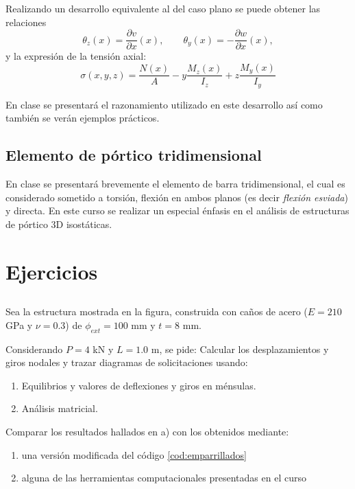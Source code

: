 Realizando un desarrollo equivalente al del caso plano se puede obtener las relaciones 
%
\begin{equation}
 \theta_z(x) = \frac{\partial v}{\partial x}(x), \qquad  \theta_y(x) = - \frac{\partial w}{\partial x}(x),
\end{equation}
%
y la expresión de la tensión axial:
%
\begin{equation}\label{eqn:tensaxiflexesv}
\boxed{
	\sigma(x,y,z) = \frac{	N (x) }{A}
	- y \frac{	M_z (x) }{I_z} + z \frac{	M_y (x) }{I_y} 
}
\end{equation}

En clase se presentará el razonamiento utilizado en este desarrollo así como también se verán ejemplos prácticos.




\subsection{Elemento de pórtico tridimensional}

En clase se presentará brevemente el elemento de barra tridimensional, el cual es considerado sometido a torsión, flexión en ambos planos (es decir \textit{flexión esviada}) y directa. %
%
En este curso se realizar un especial énfasis en el análisis de estructuras de pórtico 3D isostáticas.

\section{Ejercicios}
\setcounter{ejercicio}{0}

\subsection{}

Sea la estructura mostrada en la figura, construida con caños de acero ($E=210$ GPa y $\nu =0.3$) de $\phi_{ext} = 100$ mm y $t=8$ mm.

\begin{center}
	\def\svgwidth{0.5\textwidth}
	
\end{center}

Considerando $P=4$ kN y $L=1.0$ m, se pide:
%
\parte Calcular los desplazamientos y giros nodales y trazar diagramas de solicitaciones usando:
\begin{enumerate}
\item Equilibrios y valores de deflexiones y giros en ménsulas. 
\item Análisis matricial.
\end{enumerate}
\parte Comparar los resultados hallados en a) con los obtenidos mediante:
  \begin{enumerate}
   \item una versión modificada del código \ref{cod:emparrillados}
  \item alguna de las herramientas computacionales presentadas en el curso
  \end{enumerate}


